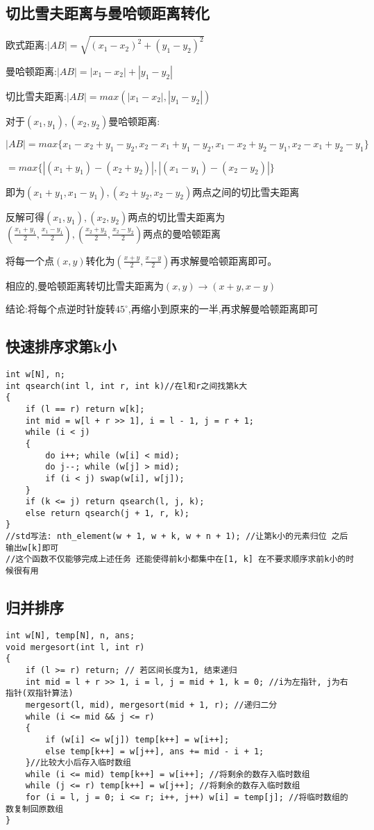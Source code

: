 \documentclass[a4paper,fontset=none]{ctexart}
\begin{document}
\subsection{切比雪夫距离与曼哈顿距离转化}

欧式距离:$|AB|=\sqrt{(x_1-x_2)^2+(y_1-y_2)^2}$

曼哈顿距离:$|AB|=|x_1-x_2|+|y_1-y_2|$

切比雪夫距离:$|AB|=max(|x_1-x_2|,|y_1-y_2|)$

对于$(x_1,y_1),(x_2,y_2)$曼哈顿距离:

$|AB|=max\{x_1-x_2+y_1-y_2,x_2-x_1+y_1-y_2,x_1-x_2+y_2-y_1,x_2-x_1+y_2-y_1\}$

$=max\{|(x_1+y_1)-(x_2+y_2)|,|(x_1-y_1)-(x_2-y_2)|\}$

即为$(x_1+y_1,x_1-y_1),(x_2+y_2,x_2-y_2)$两点之间的切比雪夫距离

反解可得$(x_1,y_1),(x_2,y_2)$两点的切比雪夫距离为$(\frac{x_1+y_1}{2},\frac{x_1-y_1}{2}),(\frac{x_2+y_2}{2},\frac{x_2-y_2}{2})$两点的曼哈顿距离

将每一个点$(x,y)$转化为$(\frac{x+y}{2},\frac{x-y}{2})$再求解曼哈顿距离即可。

相应的,曼哈顿距离转切比雪夫距离为$(x,y)\rightarrow (x+y,x-y)$

结论:将每个点逆时针旋转$45^\circ$,再缩小到原来的一半,再求解曼哈顿距离即可
\subsection{快速排序求第k小}

\begin{verbatim}
int w[N], n;
int qsearch(int l, int r, int k)//在l和r之间找第k大
{
    if (l == r) return w[k];
    int mid = w[l + r >> 1], i = l - 1, j = r + 1;
    while (i < j)
    {
        do i++; while (w[i] < mid);
        do j--; while (w[j] > mid);
        if (i < j) swap(w[i], w[j]);
    }
    if (k <= j) return qsearch(l, j, k);
    else return qsearch(j + 1, r, k);
}
//std写法: nth_element(w + 1, w + k, w + n + 1); //让第k小的元素归位 之后输出w[k]即可
//这个函数不仅能够完成上述任务 还能使得前k小都集中在[1, k] 在不要求顺序求前k小的时候很有用
\end{verbatim}
\subsection{归并排序}

\begin{verbatim}
int w[N], temp[N], n, ans;
void mergesort(int l, int r)
{
    if (l >= r) return; // 若区间长度为1, 结束递归
    int mid = l + r >> 1, i = l, j = mid + 1, k = 0; //i为左指针, j为右指针(双指针算法)
    mergesort(l, mid), mergesort(mid + 1, r); //递归二分
    while (i <= mid && j <= r)
    {
        if (w[i] <= w[j]) temp[k++] = w[i++];
        else temp[k++] = w[j++], ans += mid - i + 1;
    }//比较大小后存入临时数组
    while (i <= mid) temp[k++] = w[i++]; //将剩余的数存入临时数组
    while (j <= r) temp[k++] = w[j++]; //将剩余的数存入临时数组
    for (i = l, j = 0; i <= r; i++, j++) w[i] = temp[j]; //将临时数组的数复制回原数组
}
\end{verbatim}
\end{document}
